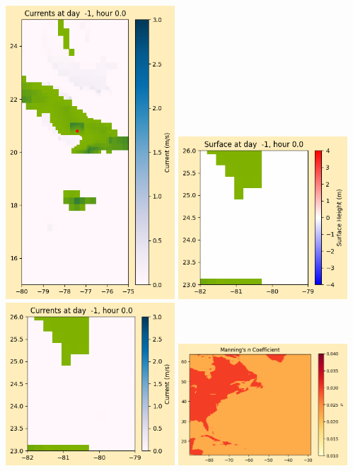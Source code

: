 \documentclass[11pt]{article}
\begin{document}
\includegraphics[width=0.475\textwidth]{frame0008fig1008.png}
\vskip 10pt 
\includegraphics[width=0.475\textwidth]{frame0008fig1009.png}
\includegraphics[width=0.475\textwidth]{frame0008fig1010.png}
\vskip 10pt 
\includegraphics[width=0.475\textwidth]{frame0008fig1011.png}
\end{document}
